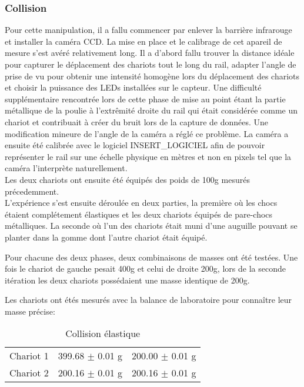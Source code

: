 \subsubsection{Collision}
Pour cette manipulation, il a fallu commencer par enlever la barrière infrarouge et installer la caméra CCD.
La mise en place et le calibrage de cet apareil de mesure s'est avéré relativement long. Il a d'abord fallu trouver la distance idéale pour capturer le déplacement des chariots tout le long du rail, adapter l'angle de prise de vu pour obtenir une intensité homogène lors du déplacement des chariots et choisir la puissance des LEDs installées sur le capteur. Une difficulté supplémentaire rencontrée lors de cette phase de mise au point étant la partie métallique de la poulie à l'extrêmité droite du rail qui était considérée comme un chariot et contribuait à créer du bruit lors de la capture de données. Une modification mineure de l'angle de la caméra a réglé ce problème.
La caméra a ensuite été calibrée avec le logiciel INSERT\_LOGICIEL afin de pouvoir représenter le rail sur une échelle physique en mètres et non en pixels tel que la caméra l'interprète naturellement.\\
Les deux chariots ont ensuite été équipés des poids de 100g mesurés précedemment. \\

L'expérience s'est ensuite déroulée en deux parties, la première où les chocs étaient complétement élastiques et les deux chariots équipés de pare-chocs métalliques. La seconde où l'un des chariots était muni d'une auguille pouvant se planter dans la gomme dont l'autre chariot était équipé.

Pour chacune des deux phases, deux combinaisons de masses ont été testées. Une fois le chariot de gauche pesait 400g et celui de droite 200g, lors de la seconde itération les deux chariots possédaient une masse identique de 200g.

Les chariots ont étés mesurés avec la balance de laboratoire pour connaître leur masse précise:
\begin{table}[h]
    \centering
    \caption{Collision élastique}
    \begin{tabular}{|l|l|l|}
	\hline
	Chariot 1 & 399.68 $\pm$ 0.01 g & 200.00 $\pm$ 0.01 g \\
	Chariot 2 & 200.16 $\pm$ 0.01 g & 200.16 $\pm$ 0.01 g \\
	\hline
    \end{tabular}
\end{table}

